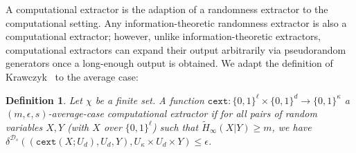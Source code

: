 \documentclass[11pt]{article}
\newcommand{\defref}[1]{\mbox{Definition~\ref{#1}}}
\newcommand{\class}[1]{{\ensuremath{\mathsf{#1}}}}
\newcommand{\gen}{\ensuremath{\class{Gen}}\xspace}
\newcommand{\rep}{\ensuremath{\class{Rep}}\xspace}
\newcommand{\zo}{\ensuremath{\{0, 1\}}}
\newcommand{\dis}{\ensuremath{\mathsf{dis}}}
\newcommand{\hill}{\ensuremath{\mathtt{HILL}}\xspace}
\newcommand{\cext}{\ensuremath{\mathtt{cext}}}
\newtheorem{definition}[theorem]{Definition}
\begin{document}
\iffalse
\begin{definition}
\label{def:comp fuzzy cond}
Let $\mathcal{W}$ be a family of probability distributions over $\mathcal{M}$.  A pair of randomized procedures ``generate'' ($\gen$) and ``reproduce'' ($\rep$) is an $(\mathcal{M}, \mathcal{W}, \tilde{m}, t$)-computational fuzzy conductor that is $(\epsilon, s)$-hard with error $\delta$ if $\gen$ and $\rep$ satisfy the following properties (the first two properties are the same as in \defref{def:comp fuzzy extractor}, with $x$ replacing $r$):
\begin{itemize}
\item The generate procedure $\gen$ on input $w\in \mathcal{M}$ outputs a string $x\in\{0,1\}^\ell$ and a helper string $p\in\{0,1\}^*$.
\item The reproduction procedure $\rep$ takes an element $w'\in\mathcal{M}$ and a bit string $p\in\{0,1\}^*$ as inputs.  The \emph{correctness} property guarantees that if $\dis(w, w')\leq t$ and $(x, p)\leftarrow \gen(w)$, then $\Pr[\rep(w',p) = x] \geq 1-\delta$ where the probability is over the randomness of $(\gen, \rep)$.
If $\dis(w, w') > t$, then no guarantee is provided about the output of $\rep$.
\item The \emph{security} property guarantees that for any distribution $W\in \mathcal{W}$, the string $x$ has high HILL entropy conditioned on $P$.  That is $H^{\hill}_{\epsilon_{cond}, s_{cond}}(X |P)\geq \tilde{m}$.
\end{itemize}
\end{definition}
\fi

A computational extractor is the adaption of a randomness extractor to the computational setting.  Any information-theoretic randomness extractor is also a computational extractor; however, unlike information-theoretic extractors, computational extractors can expand their output arbitrarily via pseudorandom generators once a long-enough output is obtained. We adapt the definition of Krawczyk~\cite{krawczyk2010cryptographic} to the average case:
\begin{definition}
Let $\chi$ be a finite set.
A function $\cext: \zo^\ell \times \{0,1\}^d \rightarrow \{0,1\}^\kappa$ a \emph{$(m, \epsilon, s)$-average-case computational extractor} if for all pairs
of random variables $X, Y$ (with $X$ over $\zo^\ell$) such that
$\tilde{H}_\infty(X|Y) \ge m$, we have $\delta^{\mathcal{D}_{s}}((\cext(X; U_d), U_d, Y), U_\kappa\times
U_d \times Y) \le \epsilon$.
\end{definition}
\end{document}

